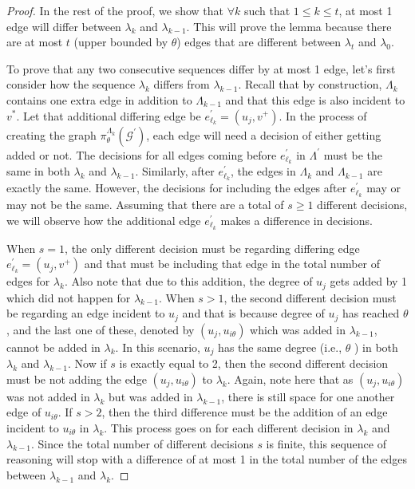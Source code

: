 \begin{proof}
In the rest of the proof, we show that $\forall k$ such that $1 \leq k \leq t$, at most 1 edge will differ between $\lambda_k$ and $\lambda_{k-1}$. This will prove the lemma because there are at most $t$ (upper bounded by $\theta$) edges that are different between $\lambda_t$ and $\lambda_0$.

To prove that any two consecutive sequences differ by at most 1 edge, let's first consider how the sequence $\lambda_k$ differs from $\lambda_{k-1}$. Recall that by construction, $\Lambda_k$ contains one extra edge in addition to $\Lambda_{k-1}$ and that this edge is also incident to $v^*$. Let that additional differing edge be $e_{\ell_k}^\prime = (u_j, v^+)$. In the process of creating the graph $\pi_\theta^{\Lambda_k}(\mathcal{G}^{\prime})$, each edge will need a decision of either getting added or not. The decisions for all edges coming before $e_{\ell_k}^{\prime}$ in $\Lambda^{\prime}$ must be the same in both $\lambda_k$ and $\lambda_{k-1}$. Similarly, after $e_{\ell_k}^{\prime}$, the edges in $\Lambda_k$ and $\Lambda_{k-1}$ are exactly the same. However, the decisions for including the edges after $e_{\ell_k}^{\prime}$ may or may not be the same. Assuming that there are a total of $s \geq 1$ different decisions, we will observe how the additional edge $e_{\ell_k}^{\prime}$ makes a difference in decisions. 


When $s=1$, the only different decision must be regarding differing edge $e_{\ell_k}^\prime = (u_j, v^+)$ and that must be including that edge in the total number of edges for $\lambda_k$. Also note that due to this addition, the degree of $u_j$ gets added by 1 which did not happen for $\lambda_{k-1}$. When $s>1$, the second different decision must be regarding an edge incident to $u_j$ and that is because degree of $u_j$ has reached $\theta$, and the last one of these, denoted by $(u_j, u_{i \theta})$ which was added in $\lambda_{k-1}$, cannot be added in $\lambda_k$. In this scenario, $u_j$ has the same degree (i.e., $\theta$ ) in both $\lambda_k$ and $\lambda_{k-1}$. Now if $s$ is exactly equal to 2, then the second different decision must be not adding the edge $(u_j, u_{i \theta})$ to $\lambda_k$. Again, note here that as $(u_j, u_{i \theta})$ was not added in $\lambda_k$ but was added in $\lambda_{k-1}$, there is still space for one another edge of $u_{i \theta}$. If $s>2$, then the third difference must be the addition of an edge incident to $u_{i \theta}$ in $\lambda_k$. This process goes on for each different decision in $\lambda_k$ and $\lambda_{k-1}$. Since the total number of different decisions $s$ is finite, this sequence of reasoning will stop with a difference of at most 1 in the total number of the edges between $\lambda_{k-1}$ and $\lambda_k$.


\end{proof}
